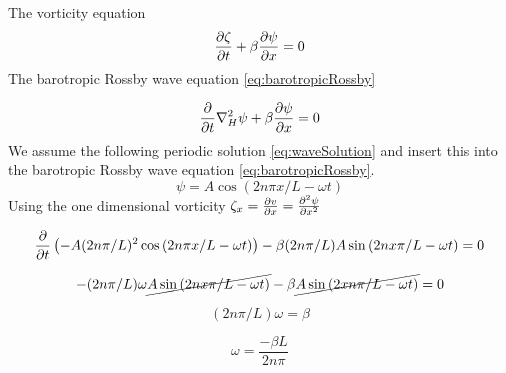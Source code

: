 The vorticity equation
\begin{equation}\label{eq:gov_vort}
    \pdv{\zeta}{t} + \beta \pdv{\psi}{x} = 0
\end{equation}
The barotropic Rossby wave equation \cref{eq:barotropicRossby}

\begin{equation}\label{eq:barotropicRossby}
    \frac{\partial}{\partial t}{} \nabla_H^2 \psi + \beta \pdv{\psi}{x} = 0 
\end{equation}
We assume the following periodic solution \cref{eq:waveSolution} and 
insert this into the barotropic Rossby wave equation \cref{eq:barotropicRossby}.
\begin{equation}\label{eq:waveSolution}
    \psi = A\cos{(2n\pi x /L - \omega t)}
\end{equation}
Using the one dimensional vorticity $\zeta_x = \pdv{v}{x} = \pdv[2]{\psi}{x}$ 

\begin{equation}
    \pdv{}{t} \left(-A (2n\pi/L)^2  \cos{(2n\pi x/L - \omega t)}\right) - \beta 
     (2n\pi/L) A \sin{(2n x\pi/L - \omega t) = 0}
\end{equation}

\begin{equation}
    -(2n\pi/L)\omega \cancel{A\sin{(2n x\pi/L - \omega t)}} - \beta 
    \cancel{A\sin{(2 xn\pi/L - \omega t)}} = 0
\end{equation}

\begin{equation}
    (2n\pi / L) \omega = \beta
\end{equation}

\begin{equation}\label{eq:omega1}
    \omega = \frac{-\beta L}{2n\pi} 
\end{equation}

